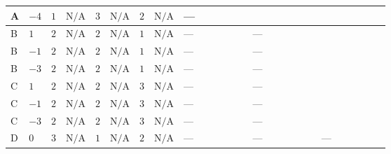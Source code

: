 \documentclass[8pt]{article}
\begin{document}
\begin{landscape}
\begin{longtable}{@{}llcccccc >{\raggedright\arraybackslash}p{0.21\linewidth} >{\raggedright\arraybackslash}p{0.21\linewidth} >{\raggedright\arraybackslash}p{0.21\linewidth}@{}}
\midrule
A & $-4$ & $1$ & $\text{N/A}$ & $3$ & $\text{N/A}$ & $2$ & $\text{N/A}$ & --- & \scriptsize\adjustbox{max width=\linewidth}{$\begin{gathered} -\frac{33 {g_2}^2 {\lambda_{HS_2}^{(A)}}}{2}\end{gathered}$} & \scriptsize\adjustbox{max width=\linewidth}{$\begin{gathered} +2 {\lambda_1} {\lambda_{HS_2}^{(A)}}\end{gathered}$} \\
\midrule
B & $1$ & $2$ & $\text{N/A}$ & $2$ & $\text{N/A}$ & $1$ & $\text{N/A}$ & --- & --- & \scriptsize\adjustbox{max width=\linewidth}{$\begin{gathered} +2 {\lambda_1} {\lambda_{HS_2}^{(A)}}\end{gathered}$} \\
\midrule
B & $-1$ & $2$ & $\text{N/A}$ & $2$ & $\text{N/A}$ & $1$ & $\text{N/A}$ & --- & --- & \scriptsize\adjustbox{max width=\linewidth}{$\begin{gathered} +2 {\lambda_1} {\lambda_{HS_2}^{(A)}}\end{gathered}$} \\
\midrule
B & $-3$ & $2$ & $\text{N/A}$ & $2$ & $\text{N/A}$ & $1$ & $\text{N/A}$ & --- & --- & \scriptsize\adjustbox{max width=\linewidth}{$\begin{gathered} +2 {\lambda_1} {\lambda_{HS_2}^{(A)}}\end{gathered}$} \\
\midrule
C & $1$ & $2$ & $\text{N/A}$ & $2$ & $\text{N/A}$ & $3$ & $\text{N/A}$ & --- & --- & \scriptsize\adjustbox{max width=\linewidth}{$\begin{gathered} +2 {\lambda_1} {\lambda_{HS_2}^{(A)}}\end{gathered}$} \\
\midrule
C & $-1$ & $2$ & $\text{N/A}$ & $2$ & $\text{N/A}$ & $3$ & $\text{N/A}$ & --- & --- & \scriptsize\adjustbox{max width=\linewidth}{$\begin{gathered} +2 {\lambda_1} {\lambda_{HS_2}^{(A)}}\end{gathered}$} \\
\midrule
C & $-3$ & $2$ & $\text{N/A}$ & $2$ & $\text{N/A}$ & $3$ & $\text{N/A}$ & --- & --- & \scriptsize\adjustbox{max width=\linewidth}{$\begin{gathered} +2 {\lambda_1} {\lambda_{HS_2}^{(A)}}\end{gathered}$} \\
\midrule
D & $0$ & $3$ & $\text{N/A}$ & $1$ & $\text{N/A}$ & $2$ & $\text{N/A}$ & --- & --- & --- \\

\end{longtable}
\end{landscape}
\end{document}
